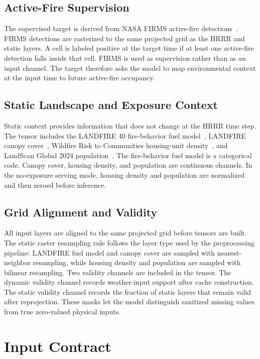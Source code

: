 \documentclass[11pt]{article}
\begin{document}
\subsection{Active-Fire Supervision}

The supervised target is derived from NASA FIRMS active-fire detections~\cite{nasa_firms}.
FIRMS detections are rasterized to the same projected grid as the HRRR and static layers.
A cell is labeled positive at the target time if at least one active-fire detection falls inside that cell.
FIRMS is used as supervision rather than as an input channel.
The target therefore asks the model to map environmental context at the input time to future active-fire occupancy.

\subsection{Static Landscape and Exposure Context}

Static context provides information that does not change at the HRRR time step.
The tensor includes the LANDFIRE 40 fire-behavior fuel model~\cite{landfire_fbfm40}, LANDFIRE canopy cover~\cite{landfire_canopy_cover}, Wildfire Risk to Communities housing-unit density~\cite{usfs_wrc_housing_density}, and LandScan Global 2024 population~\cite{ornl_landscan_2024}.
The fire-behavior fuel model is a categorical code.
Canopy cover, housing density, and population are continuous channels.
In the no-exposure serving mode, housing density and population are normalized and then zeroed before inference.

\subsection{Grid Alignment and Validity}

All input layers are aligned to the same projected grid before tensors are built.
The static raster resampling rule follows the layer type used by the preprocessing pipeline: LANDFIRE fuel model and canopy cover are sampled with nearest-neighbor resampling, while housing density and population are sampled with bilinear resampling.
Two validity channels are included in the tensor.
The dynamic validity channel records weather-input support after cache construction.
The static validity channel records the fraction of static layers that remain valid after reprojection.
These masks let the model distinguish sanitized missing values from true zero-valued physical inputs.

\section{Input Contract}
\label{sec:input_contract}
\end{document}
